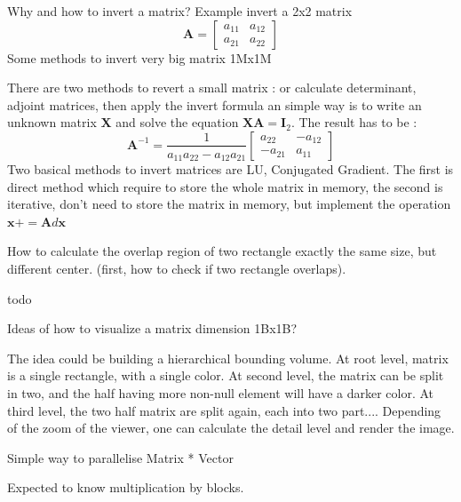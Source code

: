 \documentclass[answers]{exam}
\newcommand{\mathvec}[1]{\textbf{#1}}
\begin{document}
\begin{questions}
\question Why and how to invert a matrix? Example invert a 2x2 matrix 
\[
\mathvec{A}=
\left[ 
\begin{array}{cc}
a_{11} & a_{12}\\
a_{21} & a_{22}
\end{array} 
\right]
\]
Some methods to invert very big matrix 1Mx1M
\begin{solution}[.2in]
There are two methods to revert a small matrix : or calculate determinant, adjoint matrices, then apply the invert formula an simple way is to write an unknown matrix $\mathvec{X}$ and solve the equation $\mathvec{X}\mathvec{A}=\mathvec{I}_2$. The result has to be :
\[
\mathvec{A}^{-1}=
\frac{1}{a_{11}a_{22}-a_{12}a_{21}}
\left[ 
\begin{array}{cc}
a_{22} & -a_{12}\\
-a_{21} & a_{11}
\end{array} 
\right]
\]
Two basical methods to invert matrices are LU, Conjugated Gradient. The first is direct method which require to store the whole matrix in memory, the second is iterative, don't need to store the matrix in memory, but implement the operation $\mathvec{x}+=\mathvec{A}d\mathvec{x}$
\end{solution}

\question How to calculate the overlap region of two rectangle exactly the same size, but different center. (first, how to check if two rectangle overlaps).
\begin{solution}[.2in]
	todo
\end{solution}

\question Ideas of how to visualize a matrix dimension 1Bx1B?
\begin{solution}[.2in]
The idea could be building a hierarchical bounding volume. At root level, matrix is a single rectangle, with a single color. At second level, the matrix can be split in two, and the half having more non-null element will have a darker color. At third level, the two half matrix are split again, each into two part.... Depending of the zoom of the viewer, one can calculate the detail level and render the image.
\end{solution}

\question Simple way to parallelise Matrix * Vector
\begin{solution}[.2in]
Expected to know multiplication by blocks.
\end{solution}


\end{questions}
\end{document}
